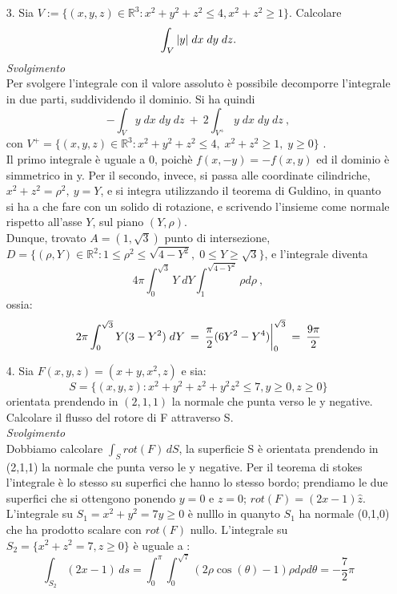 \documentclass[a4paper]{article}
\begin{document}
\begin{itemize}
 \item[3.] Sia $V := \{(x, y, z)\in \mathbb{R}^{3} : x^{2} + y^{2} + z^{2} \leq 4, x^{2} + z^{2} \geq 1\}$. Calcolare
\begin{equation*}
\int_{V} \abs{y}\; dx\; dy \; dz.
\end{equation*}
\emph{Svolgimento}\\
Per svolgere l'integrale con il valore assoluto è possibile decomporre l'integrale in due parti, suddividendo il dominio. Si ha quindi
\begin{equation}
-\int_{V} y\; dx\; dy \; dz\: + \: 2\int_{V^{+}} y\; dx\; dy \; dz\:,
\end{equation}
con $V^{+} = \{(x, y, z)\in \mathbb{R}^{3} : x^{2} + y^{2} + z^{2} \leq 4,\; x^{2} + z^{2} \geq 1,\; y \geq 0 \}$ .\\
Il primo integrale è uguale a 0, poichè $f(x,-y)=-f(x,y)$ ed il dominio è simmetrico in y.
Per il secondo, invece, si passa alle coordinate cilindriche, $x^{2} + z^{2} = \rho^{2},\: y=Y$, e si integra utilizzando il teorema di Guldino, in quanto si ha a che fare con un solido di rotazione, e scrivendo l'insieme come normale rispetto all'asse $Y$, sul piano $(Y,\rho)$.\\
Dunque, trovato $A=(1,\sqrt{3})$ punto di intersezione, $D = \{(\rho, Y)\in \mathbb{R}^{2} : 1 \leq \rho^{2} \leq \sqrt{4 - Y^{2}},\; 0 \leq Y \geq \sqrt{3} \}$, e l'integrale diventa
\begin{equation}
4\pi\int_{0}^{\sqrt{3}} Y\; dY \int_{1}^{\sqrt{4-Y^{2}}} \rho d\rho\:,
\end{equation}
ossia:
\begin{equation}
2\pi\int_{0}^{\sqrt{3}} Y(3-Y^{2}) \; dY \: = \: \frac{\pi}{2}(6Y^{2} - Y^{4})\bigg{|}_{0}^{\sqrt{3}}\: = \:\frac{9\pi}{2}
\end{equation}





\item [4.]
Sia $F(x,y,z)=(x+y,x^2,z)$ e sia:
\begin{equation*}
S= \{(x,y,z):x^2+y^2+z^2+y^2z^2 \le 7 ,y \ge 0, z \ge 0 \}
\end{equation*}
orientata prendendo in $(2, 1, 1)$ la normale che punta verso le y negative. Calcolare
il flusso del rotore di F attraverso S.\\
\emph{Svolgimento}\\
Dobbiamo calcolare $ \int_{S} rot(F)\,dS $, la superficie S è orientata prendendo in (2,1,1) la normale che punta verso le y negative.
Per il teorema di stokes l'integrale è lo stesso su superfici che hanno lo stesso bordo; prendiamo le due superfici che si ottengono ponendo $y=0$ e $z =0$; $ rot(F)= (2x-1) \hat{z} $.
L'integrale su $S_1={x^2+y^2 = 7 y \ge 0}$ è nulllo in quanyto $S_1 $ ha normale (0,1,0) che ha prodotto scalare con $rot(F)$ nullo.
L'integrale su $ S_2=\{x^2+z^2=7, z \ge 0 \}$ è uguale a :
\begin{equation}
\int_{S_2}(2x-1)\,ds=\int_{0}^{\pi} \int_{0}^{\sqrt{7}} (2\rho \cos(\theta)-1) \rho d\rho d\theta=-\frac{7}{2}\pi
\end{equation}
\end{itemize}
\end{document}
